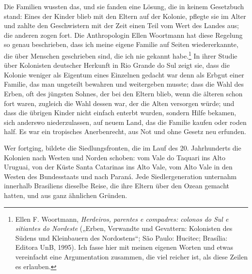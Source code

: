 \documentclass[
  ngerman,
  11pt,
  openany]{book}
\begin{document}
Die Familien wussten das, und sie fanden eine Lösung, die in keinem
Gesetzbuch stand: Eines der Kinder blieb mit den Eltern auf der Kolonie,
pflegte sie im Alter und zahlte den Geschwistern mit der Zeit einen Teil
vom Wert des Landes aus; die anderen zogen fort. Die Anthropologin Ellen
Woortmann hat diese Regelung so genau beschrieben, dass ich meine eigene
Familie auf Seiten wiedererkannte, die über Menschen geschrieben sind,
die ich nie gekannt habe.\footnote{Ellen F. Woortmann, \emph{Herdeiros,
  parentes e compadres: colonos do Sul e sitiantes do Nordeste} („Erben,
  Verwandte und Gevattern: Kolonisten des Südens und Kleinbauern des
  Nordostens``; São Paulo: Hucitec; Brasília: Editora UnB, 1995). Ich
  fasse hier mit meinen eigenen Worten und etwas vereinfacht eine
  Argumentation zusammen, die viel reicher ist, als diese Zeilen es
  erlauben.} In ihrer Studie über Kolonisten deutscher Herkunft in Rio
Grande do Sul zeigt sie, dass die Kolonie weniger als Eigentum eines
Einzelnen gedacht war denn als Erbgut einer Familie, das man ungeteilt
bewahren und weitergeben musste; dass die Wahl des Erben, oft des
jüngsten Sohnes, der bei den Eltern blieb, wenn die älteren schon fort
waren, zugleich die Wahl dessen war, der die Alten versorgen würde; und
dass die übrigen Kinder nicht einfach enterbt wurden, sondern Hilfe
bekamen, sich anderswo niederzulassen, auf neuem Land, das die Familie
kaufen oder roden half. Es war ein tropisches Anerbenrecht, aus Not und
ohne Gesetz neu erfunden.

Wer fortging, bildete die Siedlungsfronten, die im Lauf des 20.
Jahrhunderts die Kolonien nach Westen und Norden schoben: vom Vale do
Taquari ins Alto Uruguai, von der Küste Santa Catarinas ins Alto Vale,
vom Alto Vale in den Westen des Bundesstaats und nach Paraná. Jede
Siedlergeneration unternahm innerhalb Brasiliens dieselbe Reise, die
ihre Eltern über den Ozean gemacht hatten, und aus ganz ähnlichen
Gründen.
\end{document}
